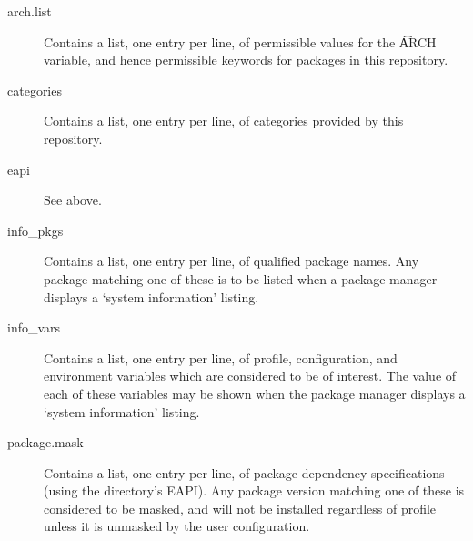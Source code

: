 \begin{description}
\item[arch.list] \label{arch.list} Contains a list, one entry per line, of permissible values for
    the \t{ARCH} variable, and hence permissible keywords for packages in this repository.
\item[categories] \label{profiles-categories} Contains a list, one entry per line, of categories
    provided by this repository.
\item[eapi] See above.
\item[info_pkgs] Contains a list, one entry per line, of qualified package names. Any package
    matching one of these is to be listed when a package manager displays a `system information'
    listing.
\item[info_vars] Contains a list, one entry per line, of profile, configuration, and environment
    variables which are considered to be of interest. The value of each of these variables may be
    shown when the package manager displays a `system information' listing.
\item[package.mask] \label{profiles-package.mask}
    Contains a list, one entry per line, of package dependency specifications (using the directory's
    EAPI). Any package version matching one of these is considered to be masked, and will not be
    installed regardless of profile unless it is unmasked by the user configuration.


\end{description}
